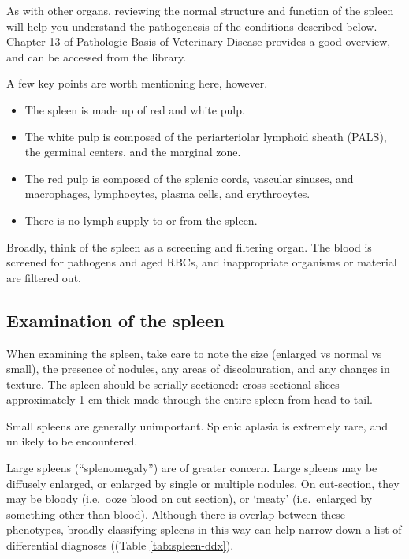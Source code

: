 \documentclass[openany]{article}
\providecommand{\tightlist}{%
  \setlength{\itemsep}{0pt}\setlength{\parskip}{0pt}}
\begin{document}
As with other organs, reviewing the normal structure and function of the
spleen will help you understand the pathogenesis of the conditions
described below. Chapter 13 of Pathologic Basis of Veterinary Disease
provides a good overview, and can be accessed from the library.

A few key points are worth mentioning here, however.

\begin{itemize}
\tightlist
\item
  The spleen is made up of red and white pulp.
\item
  The white pulp is composed of the periarteriolar lymphoid sheath
  (PALS), the germinal centers, and the marginal zone.
\item
  The red pulp is composed of the splenic cords, vascular sinuses, and
  macrophages, lymphocytes, plasma cells, and erythrocytes.
\item
  There is no lymph supply to or from the spleen.
\end{itemize}

Broadly, think of the spleen as a screening and filtering organ. The
blood is screened for pathogens and aged RBCs, and inappropriate
organisms or material are filtered out.

\subsection{Examination of the spleen}\label{examination-of-the-spleen}

When examining the spleen, take care to note the size (enlarged vs
normal vs small), the presence of nodules, any areas of discolouration,
and any changes in texture. The spleen should be serially sectioned:
cross-sectional slices approximately 1 cm thick made through the entire
spleen from head to tail.

Small spleens are generally unimportant. Splenic aplasia is extremely
rare, and unlikely to be encountered.

Large spleens (``splenomegaly'') are of greater concern. Large spleens
may be diffusely enlarged, or enlarged by single or multiple nodules. On
cut-section, they may be bloody (i.e.~ooze blood on cut section), or
`meaty' (i.e.~enlarged by something other than blood). Although there is
overlap between these phenotypes, broadly classifying spleens in this
way can help narrow down a list of differential diagnoses ((Table
\ref{tab:spleen-ddx}).
\end{document}
